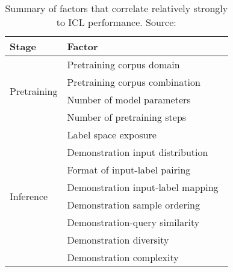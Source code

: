 \begin{table}[h!]
	\centering
	\small
	\begin{tabularx}{0.8\textwidth}{lX}
		\toprule
		\textbf{Stage} & \textbf{Factor}                                                                               \\
		\midrule
		\multirow{4}{*}{Pretraining}
		               & Pretraining corpus domain~\cite{shin2022effect}                                               \\
		               & Pretraining corpus combination~\cite{shin2022effect}                                          \\
		               & Number of model parameters~\cite{wei2022emergent, brown2020language}                          \\
		               & Number of pretraining steps~\cite{wei2022emergent}                                            \\
		\midrule
		\multirow{8}{*}{Inference}
		               & Label space exposure~\cite{min2022rethinking}                                                 \\
		               & Demonstration input distribution~\cite{min2022rethinking}                                     \\
		               & Format of input-label pairing~\cite{min2022rethinking,an2023how}                              \\
		               & Demonstration input-label mapping~\cite{min2022rethinking, yoo2022groundtruth, wei2023symbol} \\
		               & Demonstration sample ordering~\cite{lu2022fantastically}                                      \\
		               & Demonstration-query similarity~\cite{lu2022fantastically}                                     \\
		               & Demonstration diversity~\cite{an2023how}                                                      \\
		               & Demonstration complexity~\cite{an2023how}                                                     \\
		\bottomrule
	\end{tabularx}
	\caption{Summary of factors that correlate relatively strongly to ICL performance. Source: \textcite{dong2023survey}}
	\label{tab:icl-factors}
\end{table}

